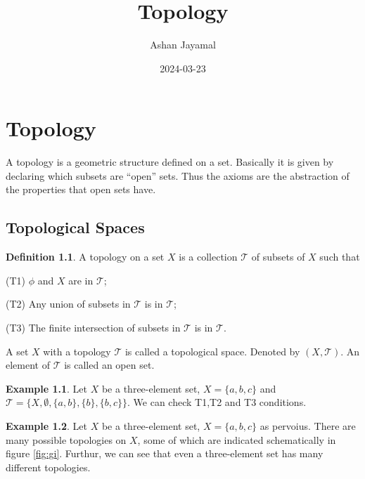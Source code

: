 \documentclass[
]{book}
\title{Topology}
\author{Ashan Jayamal}
\date{2024-03-23}
\theoremstyle{definition}
\newtheorem{definition}{Definition}[chapter]
\theoremstyle{definition}
\newtheorem{example}{Example}[chapter]
\theoremstyle{definition}
\theoremstyle{definition}
\theoremstyle{remark}
\begin{document}
\maketitle

{
\setcounter{tocdepth}{1}
\tableofcontents
}
\hypertarget{topology}{%
\chapter{Topology}\label{topology}}

A topology is a geometric structure defined on a set. Basically it is given by declaring which subsets are ``open'' sets. Thus the axioms are the abstraction of the properties that open sets have.

\hypertarget{topological-spaces}{%
\section{Topological Spaces}\label{topological-spaces}}

\begin{definition}
\protect\hypertarget{def:Top}{}\label{def:Top}A topology on a set \(X\) is a collection \(\mathcal{T}\) of subsets of \(X\) such that

(T1) \(\phi\) and \(X\) are in \(\mathcal{T}\);

(T2) Any union of subsets in \(\mathcal{T}\) is in \(\mathcal{T}\);

(T3) The finite intersection of subsets in \(\mathcal{T}\) is in \(\mathcal{T}\).
\end{definition}

A set \(X\) with a topology \(\mathcal{T}\) is called a topological space. Denoted by \((X,\mathcal{T})\). An element of \(\mathcal{T}\) is called an open set.

\begin{example}
\protect\hypertarget{exm:unnamed-chunk-1}{}\label{exm:unnamed-chunk-1}Let \(X\) be a three-element set, \(X = \{a, b, c\}\) and \(\mathcal{T}=\{X, \emptyset,\{a, b\}, \{b\}, \{b, c\}\}\). We can check T1,T2 and T3 conditions.
\end{example}

\begin{example}
\protect\hypertarget{exm:unnamed-chunk-2}{}\label{exm:unnamed-chunk-2}Let \(X\) be a three-element set, \(X = \{a, b, c\}\) as pervoius. There are many possible topologies on \(X\), some of which are indicated schematically in figure \ref{fig:gi}. Furthur, we can see that even a three-element set has many different topologies.
\end{example}
\end{document}
